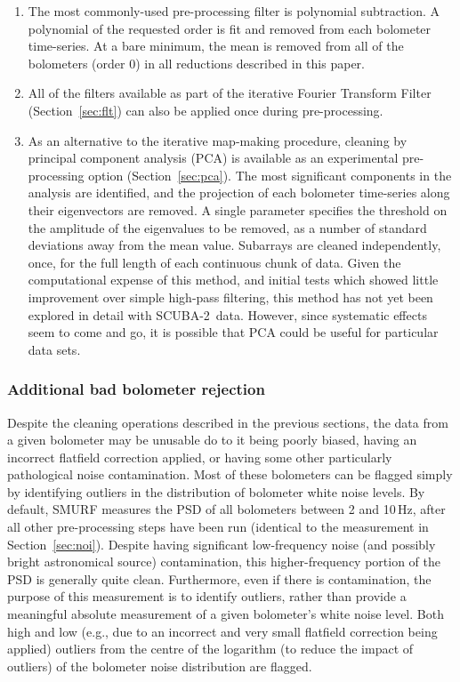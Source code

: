 \documentclass[useAMS,usenatbib,nofootinbib]{mn2e}
\newcommand{\scuba}{SCUBA-2}
\begin{document}
\begin{enumerate}

\item The most commonly-used pre-processing filter is polynomial
subtraction. A polynomial of the requested order is fit and removed
from each bolometer time-series. At a bare minimum, the mean is
removed from all of the bolometers (order 0) in all reductions
described in this paper.

\item All of the filters available as part of the iterative Fourier
Transform Filter (Section~\ref{sec:flt}) can also be applied once
during pre-processing.

\item As an alternative to the iterative map-making procedure,
cleaning by principal component analysis (PCA) is available as an
experimental pre-processing option (Section~\ref{sec:pca}). The most
significant components in the analysis are identified, and the
projection of each bolometer time-series along their eigenvectors are
removed. A single parameter specifies the threshold on the amplitude
of the eigenvalues to be removed, as a number of standard deviations
away from the mean value. Subarrays are cleaned independently, once,
for the full length of each continuous chunk of data. Given the
computational expense of this method, and initial tests which showed
little improvement over simple high-pass filtering, this method has
not yet been explored in detail with \scuba\ data. However, since
systematic effects seem to come and go, it is possible that PCA could
be useful for particular data sets.

\end{enumerate}

\subsubsection{Additional bad bolometer rejection}
\label{sec:flagbadbol}

Despite the cleaning operations described in the previous sections,
the data from a given bolometer may be unusable do to it being poorly
biased, having an incorrect flatfield correction applied, or having
some other particularly pathological noise contamination. Most of
these bolometers can be flagged simply by identifying outliers in the
distribution of bolometer white noise levels. By default, SMURF
measures the PSD of all bolometers between 2 and 10\,Hz, after all
other pre-processing steps have been run (identical to the measurement
in Section~\ref{sec:noi}). Despite having significant low-frequency
noise (and possibly bright astronomical source) contamination, this
higher-frequency portion of the PSD is generally quite
clean. Furthermore, even if there is contamination, the purpose of
this measurement is to identify outliers, rather than provide a
meaningful absolute measurement of a given bolometer's white noise
level. Both high and low (e.g., due to an incorrect and very small
flatfield correction being applied) outliers from the centre of the
logarithm (to reduce the impact of outliers) of the bolometer noise
distribution are flagged.
\end{document}
